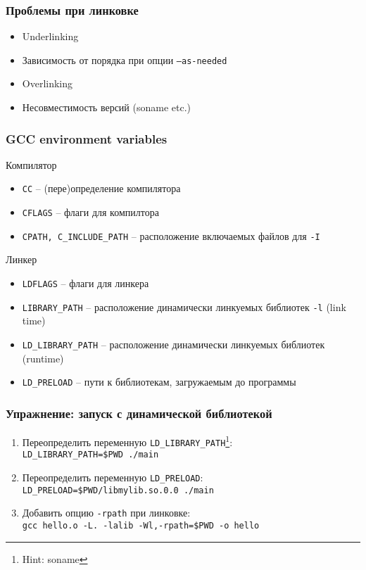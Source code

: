 \begin{frame}
 \frametitle{Проблемы при линковке}
 \begin{itemize}
   \item Underlinking
   \item Зависимость от порядка при опции {\tt --as-needed} 
   \item Overlinking
   \item Несовместимость версий (soname etc.)
 \end{itemize}
\end{frame}

\begin{frame}[fragile]
	\frametitle{GCC environment variables}

	\begin{block}{Компилятор}
		\begin{itemize}
			\item {\tt CC} -- (пере)определение компилятора
			\item {\tt CFLAGS} -- флаги для компилтора
			\item {\tt CPATH, C\_INCLUDE\_PATH} -- расположение включаемых файлов для {\tt -I}
		\end{itemize}
	\end{block}

	\begin{block}{Линкер}
		\begin{itemize}
			\item {\tt LDFLAGS} -- флаги для линкера
			\item {\tt LIBRARY\_PATH} -- расположение динамически линкуемых библиотек {\tt -l} (link time)
			\item {\tt LD\_LIBRARY\_PATH} -- расположение динамически линкуемых библиотек (runtime)
			\item {\tt LD\_PRELOAD} -- пути к библиотекам, загружаемым до программы
		\end{itemize}
	\end{block}

\end{frame}

\begin{frame}
	\frametitle{Упражнение: запуск с динамической библиотекой}

	\begin{enumerate}
		\item Переопределить переменную {\tt LD\_LIBRARY\_PATH}\footnote{Hint: soname}:\\
			{\tt LD\_LIBRARY\_PATH=\$PWD ./main}
		\item Переопределить переменную {\tt LD\_PRELOAD}:\\
			{\tt LD\_PRELOAD=\$PWD/libmylib.so.0.0 ./main}
		\item Добавить опцию {\tt -rpath} при линковке:\\
			{\tt gcc hello.o -L. -lalib -Wl,-rpath=\$PWD -o hello}
	\end{enumerate}
\end{frame}


